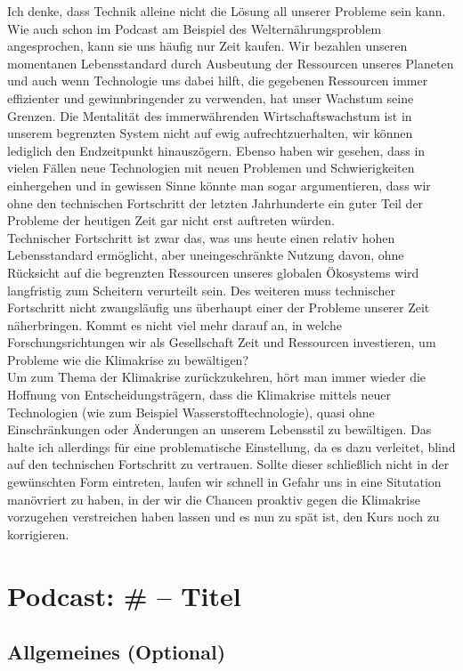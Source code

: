 \documentclass[twoside, a4paper, DIV=11, open=any, bibliography=totoc]{scrbook}
\begin{document}
Ich denke, dass Technik alleine nicht die Lösung all unserer Probleme sein kann.
Wie auch schon im Podcast am Beispiel des Welternährungsproblem angesprochen,
kann sie uns häufig nur Zeit kaufen. Wir bezahlen unseren momentanen Lebensstandard
durch Ausbeutung der Ressourcen unseres Planeten und auch wenn Technologie uns dabei
hilft, die gegebenen Ressourcen immer effizienter und gewinnbringender zu verwenden,
hat unser Wachstum seine Grenzen.
Die Mentalität des immerwährenden Wirtschaftswachstum
ist in unserem begrenzten System nicht auf ewig aufrechtzuerhalten, wir können
lediglich den Endzeitpunkt hinauszögern. Ebenso haben wir gesehen, dass in vielen Fällen
neue Technologien mit neuen Problemen und Schwierigkeiten einhergehen und in gewissen
Sinne könnte man sogar argumentieren, dass wir ohne den technischen Fortschritt
der letzten Jahrhunderte ein guter Teil der Probleme der heutigen Zeit gar nicht
erst auftreten würden. \\
Technischer Fortschritt ist zwar das, was uns heute einen relativ hohen Lebensstandard ermöglicht,
aber uneingeschränkte Nutzung davon, ohne Rücksicht auf die begrenzten Ressourcen
unseres globalen Ökosystems wird langfristig zum Scheitern verurteilt sein.
Des weiteren muss technischer Fortschritt nicht zwangsläufig uns überhaupt einer
 der Probleme unserer Zeit näherbringen. Kommt es nicht viel mehr
darauf an, in welche Forschungsrichtungen wir als Gesellschaft Zeit und Ressourcen
investieren, um Probleme wie die Klimakrise zu bewältigen? \\
Um zum Thema der Klimakrise zurückzukehren, hört man immer wieder die Hoffnung
von Entscheidungsträgern, dass die Klimakrise mittels neuer Technologien
(wie zum Beispiel Wasserstofftechnologie), quasi ohne
Einschränkungen oder Änderungen an unserem Lebensstil zu bewältigen.
Das halte ich allerdings für eine problematische Einstellung, da es dazu
verleitet, blind auf den technischen Fortschritt zu vertrauen.
Sollte dieser schließlich nicht in der gewünschten Form eintreten, laufen wir schnell
in Gefahr uns in eine Situtation manövriert zu haben, in der wir die Chancen proaktiv
gegen die Klimakrise vorzugehen verstreichen haben lassen und es nun zu spät ist,
den Kurs noch zu korrigieren.


\section{Podcast: \# -- Titel}

\subsection{Allgemeines (Optional)}
\end{document}
